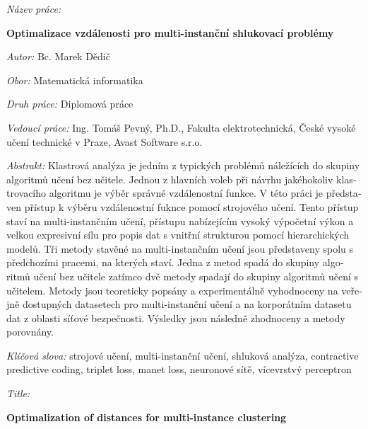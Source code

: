 \begin{czech}
	\begin{onehalfspace}
		\noindent \textit{Název práce:}

		\noindent \textbf{Optimalizace vzdálenosti pro multi-instanční shlukovací problémy}
	\end{onehalfspace}

	\bigskip

	\noindent \textit{Autor:} Bc. Marek Dědič

	\bigskip

	\noindent \textit{Obor:} Matematická informatika

	\bigskip

	\noindent \textit{Druh práce:} Diplomová práce

	\bigskip

	\noindent \textit{Vedoucí práce:} Ing. Tomáš Pevný, Ph.D., Fakulta elektrotechnická, České vysoké učení technické v Praze, Avast Software s.r.o.

	\bigskip

	\noindent \textit{Abstrakt:}
	Klastrová analýza je jedním z typických problémů náležících do skupiny algoritmů učení bez učitele. Jednou z hlavních voleb při návrhu jakéhokoliv klastrovacího algoritmu je výběr správné vzdálenostní funkce. V této práci je představen přístup k výběru vzdálenostní fuknce pomocí strojového učení. Tento přístup staví na multi-instančním učení, přístupu nabízejícím vysoký výpočetní výkon a velkou expresivní sílu pro popis dat s vnitřní strukturou pomocí hierarchických modelů. Tři metody stavěné na multi-instančním učení jsou představeny spolu s předchozími pracemi, na kterých staví. Jedna z metod spadá do skupiny algoritmů učení bez učitele zatímco dvě metody spadají do skupiny algoritmů učení s učitelem. Metody jsou teoreticky popsány a experimentálně vyhodnoceny na veřejně dostupných datasetech pro multi-instanční učení a na korporátním datasetu dat z oblasti síťové bezpečnosti. Výsledky jsou následně zhodnoceny a metody porovnány.

	\bigskip

	\noindent \textit{Klíčová slova:}
	strojové učení, multi-instanční učení, shluková analýza, contractive predictive coding, triplet loss, manet loss, neuronové sítě, vícevrstvý perceptron
\end{czech}

\vfill

\begin{onehalfspace}
	\noindent \textit{Title:}

	\noindent \textbf{Optimalization of distances for multi-instance clustering}
\end{onehalfspace}

